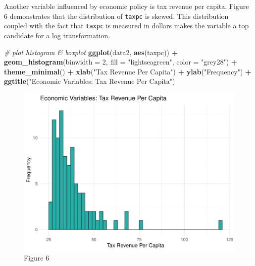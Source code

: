 \documentclass[]{article}
\newenvironment{Shaded}{\begin{snugshade}}{\end{snugshade}}
\newcommand{\CommentTok}[1]{\textcolor[rgb]{0.56,0.35,0.01}{\textit{#1}}}
\newcommand{\DataTypeTok}[1]{\textcolor[rgb]{0.13,0.29,0.53}{#1}}
\newcommand{\DecValTok}[1]{\textcolor[rgb]{0.00,0.00,0.81}{#1}}
\newcommand{\KeywordTok}[1]{\textcolor[rgb]{0.13,0.29,0.53}{\textbf{#1}}}
\newcommand{\NormalTok}[1]{#1}
\newcommand{\OperatorTok}[1]{\textcolor[rgb]{0.81,0.36,0.00}{\textbf{#1}}}
\newcommand{\StringTok}[1]{\textcolor[rgb]{0.31,0.60,0.02}{#1}}
\begin{document}
Another variable influenced by economic policy is tax revenue per
capita. Figure 6 demonstrates that the distribution of \texttt{taxpc} is
skewed. This distribution coupled with the fact that \texttt{taxpc} is
measured in dollars makes the variable a top candidate for a log
transformation.

\begin{Shaded}
\begin{Highlighting}[]
\CommentTok{# plot histogram & boxplot}
\KeywordTok{ggplot}\NormalTok{(data2, }\KeywordTok{aes}\NormalTok{(taxpc)) }\OperatorTok{+}
\StringTok{  }\KeywordTok{geom_histogram}\NormalTok{(}\DataTypeTok{binwidth =} \DecValTok{2}\NormalTok{, }\DataTypeTok{fill =} \StringTok{"lightseagreen"}\NormalTok{, }\DataTypeTok{color =} \StringTok{"grey28"}\NormalTok{) }\OperatorTok{+}
\StringTok{  }\KeywordTok{theme_minimal}\NormalTok{() }\OperatorTok{+}
\StringTok{  }\KeywordTok{xlab}\NormalTok{(}\StringTok{"Tax Revenue Per Capita"}\NormalTok{) }\OperatorTok{+}
\StringTok{  }\KeywordTok{ylab}\NormalTok{(}\StringTok{"Frequency"}\NormalTok{) }\OperatorTok{+}
\StringTok{  }\KeywordTok{ggtitle}\NormalTok{(}\StringTok{"Economic Variables: Tax Revenue Per Capita"}\NormalTok{)}
\end{Highlighting}
\end{Shaded}

\begin{figure}

{\centering \includegraphics{lab_3_final_files/figure-latex/unnamed-chunk-20-1} 

}

\caption{Figure 6}\label{fig:unnamed-chunk-20}
\end{figure}
\end{document}
